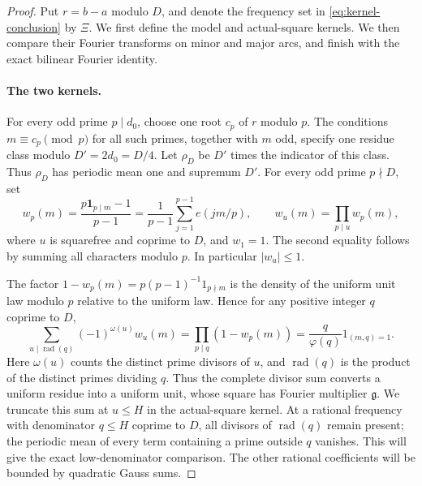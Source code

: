 \begin{proof}
Put $r=b-a$ modulo $D$, and denote the frequency set in
\eqref{eq:kernel-conclusion} by $\Xi$.
We first define the model and actual-square kernels. We then compare
their Fourier transforms on minor and major arcs, and finish with the
exact bilinear Fourier identity.

\paragraph{The two kernels.}
For every odd prime $p\mid d_0$, choose one root $c_p$ of $r$ modulo $p$.
The conditions $m\equiv c_p\pmod p$ for all such primes, together
with $m$ odd, specify one residue class modulo
$D'=2d_0=D/4$. Let $\rho_D$ be $D'$ times the indicator of this class.
Thus $\rho_D$ has periodic mean one and supremum $D'$.
For every odd prime $p\nmid D$, set
\begin{equation}
 w_p(m)=\frac{p\mathbf1_{p\mid m}-1}{p-1}
       =\frac1{p-1}\sum_{j=1}^{p-1}e(jm/p),
 \qquad
 w_u(m)=\prod_{p\mid u}w_p(m),
 \label{eq:kernel-sieve-weight}
\end{equation}
where $u$ is squarefree and coprime to $D$, and $w_1=1$.
The second equality follows by summing all characters modulo $p$.
In particular $|w_u|\le1$.

The factor $1-w_p(m)=p(p-1)^{-1}1_{p\nmid m}$ is the density of
the uniform unit law modulo $p$ relative to the uniform law. Hence for
any positive integer $q$ coprime to $D$,
\begin{equation}
 \sum_{u\mid\operatorname{rad}(q)}(-1)^{\omega(u)}w_u(m)
 =\prod_{p\mid q}(1-w_p(m))
 =\frac q{\varphi(q)}1_{(m,q)=1}.
 \label{eq:kernel-complete-sieve}
\end{equation}
Here $\omega(u)$ counts the distinct prime divisors of $u$, and
$\operatorname{rad}(q)$ is the product of the distinct primes dividing $q$. Thus the complete divisor sum
converts a uniform residue into a uniform unit, whose square has Fourier
multiplier $\mathfrak g$. We truncate this sum at $u\le H$ in the
actual-square kernel. At a rational frequency with denominator $q\le H$
coprime to $D$, all divisors of $\operatorname{rad}(q)$ remain present;
the periodic mean of every term containing a prime outside $q$ vanishes. This will give the
exact low-denominator comparison. The other rational coefficients will
be bounded by quadratic Gauss sums.


\end{proof}
